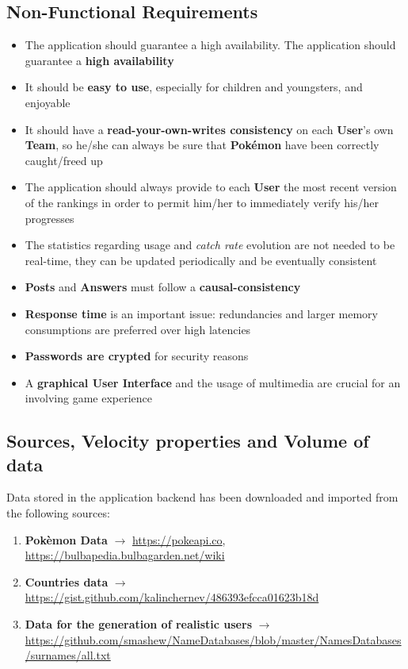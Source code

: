 \subsection{Non-Functional Requirements}
\begin{itemize}
	\item The application should guarantee a high availability. The application should guarantee a \textbf{high availability}
	\item It should be \textbf{easy to use}, especially for children and youngsters, and enjoyable
	\item It should have a \textbf{read-your-own-writes consistency} on each \textbf{User}’s own \textbf{Team}, so he/she can always be sure that \textbf{Pokémon} have been correctly caught/freed up
	\item The application should always provide to each \textbf{User} the most recent version of the rankings in order to permit him/her to immediately verify his/her progresses
	\item The statistics regarding usage and \textit{catch rate} evolution are not needed to be real-time, they can be updated periodically and be eventually consistent
	\item \textbf{Posts} and \textbf{Answers} must follow a \textbf{causal-consistency}
	\item \textbf{Response time} is an important issue: redundancies and larger memory consumptions are preferred over high latencies
	\item \textbf{Passwords are crypted} for security reasons
	\item A \textbf{graphical User Interface} and the usage of multimedia are crucial for an involving game experience 
\end{itemize}
\subsection{Sources, Velocity properties and Volume of data}
Data stored in the application backend has been downloaded and imported from the following sources:
\begin{enumerate}
	\item \textbf{Pokèmon Data} $\rightarrow$ \url{https://pokeapi.co},\\ \url{https://bulbapedia.bulbagarden.net/wiki} 
	\item \textbf{Countries data} $\rightarrow$ \url{https://gist.github.com/kalinchernev/486393efcca01623b18d}
	\item \textbf{Data for the generation of realistic users} $\rightarrow$  \url{https://github.com/smashew/NameDatabases/blob/master/NamesDatabases/surnames/all.txt}
\end{enumerate}

